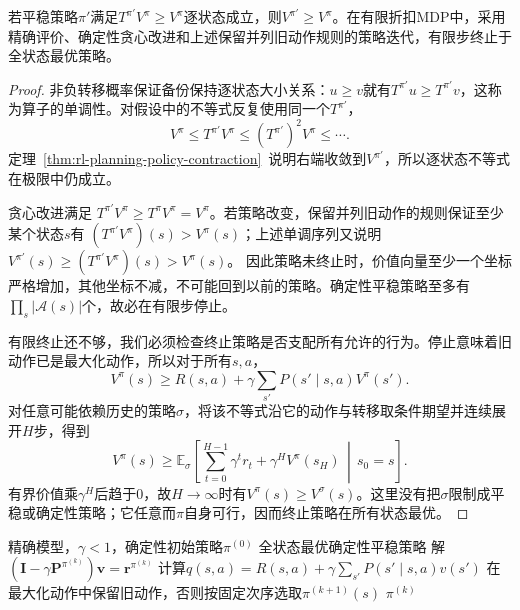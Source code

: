 \begin{theorem}[策略改进及策略迭代的有限终止]
 \label{thm:rl-planning-policy-improvement}
 若平稳策略$\pi'$满足$T^{\pi'}V^\pi\geq V^\pi$逐状态成立，则$V^{\pi'}\geq V^\pi$。在有限折扣MDP中，采用精确评价、确定性贪心改进和上述保留并列旧动作规则的策略迭代，有限步终止于全状态最优策略。
\end{theorem}
\begin{proof}
 非负转移概率保证备份保持逐状态大小关系：$u\geq v$就有$T^{\pi'}u\geq T^{\pi'}v$，这称为算子的单调性。对假设中的不等式反复使用同一个$T^{\pi'}$，
 \[
 V^\pi\leq T^{\pi'}V^\pi
 \leq (T^{\pi'})^2V^\pi\leq\cdots.
 \]
 定理~\ref{thm:rl-planning-policy-contraction}~说明右端收敛到$V^{\pi'}$，所以逐状态不等式在极限中仍成立。

 贪心改进满足
 $T^{\pi'}V^\pi\geq T^\pi V^\pi=V^\pi$。若策略改变，保留并列旧动作的规则保证至少某个状态$s$有
 $(T^{\pi'}V^\pi)(s)>V^\pi(s)$；上述单调序列又说明
 $V^{\pi'}(s)\geq(T^{\pi'}V^\pi)(s)>V^\pi(s)$。
 因此策略未终止时，价值向量至少一个坐标严格增加，其他坐标不减，不可能回到以前的策略。确定性平稳策略至多有$\prod_s|\mathcal A(s)|$个，故必在有限步停止。

 有限终止还不够，我们必须检查终止策略是否支配所有允许的行为。停止意味着旧动作已是最大化动作，所以对于所有$s,a$，
 \[
 V^\pi(s)\geq R(s,a)+\gamma\sum_{s'}P(s'\mid s,a)V^\pi(s').
 \]
 对任意可能依赖历史的策略$\sigma$，将该不等式沿它的动作与转移取条件期望并连续展开$H$步，得到
 \[
 V^\pi(s)\geq
 \mathbb E_\sigma\!\left[
 \sum_{t=0}^{H-1}\gamma^t r_t+\gamma^H V^\pi(s_H)
 \,\middle|\,s_0=s\right].
 \]
 有界价值乘$\gamma^H$后趋于0，故$H\to\infty$时有$V^\pi(s)\geq V^\sigma(s)$。这里没有把$\sigma$限制成平稳或确定性策略；它任意而$\pi$自身可行，因而终止策略在所有状态最优。
\end{proof}

\begin{algorithm}[精确策略迭代]
 \label{alg:rl-planning-policy-iteration}
 \begin{algorithmic}[1]
  \Require 精确模型，$\gamma<1$，确定性初始策略$\pi^{(0)}$
  \Ensure 全状态最优确定性平稳策略
   \State 解$(\bm I-\gamma\bm P^{\pi^{(k)}})\bm v=\bm r^{\pi^{(k)}}$
    \State 计算$q(s,a)=R(s,a)+\gamma\sum_{s'}P(s'\mid s,a)v(s')$
    \State 在最大化动作中保留旧动作，否则按固定次序选取$\pi^{(k+1)}(s)$
   \EndFor
    \State \Return $\pi^{(k)}$
   \EndIf
  \EndFor
 \end{algorithmic}
\end{algorithm}

